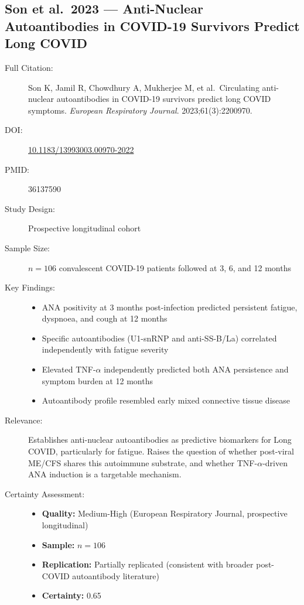 \subsection{Son et al.\ 2023 --- Anti-Nuclear Autoantibodies in COVID-19 Survivors Predict Long COVID}

\begin{description}
    \item[Full Citation:] Son K, Jamil R, Chowdhury A, Mukherjee M, et al.\ Circulating anti-nuclear autoantibodies in COVID-19 survivors predict long COVID symptoms. \textit{European Respiratory Journal}. 2023;61(3):2200970. \cite{Son2023}
    \item[DOI:] \href{https://doi.org/10.1183/13993003.00970-2022}{10.1183/13993003.00970-2022}
    \item[PMID:] 36137590
    \item[Study Design:] Prospective longitudinal cohort
    \item[Sample Size:] $n=106$ convalescent COVID-19 patients followed at 3, 6, and 12 months
    \item[Key Findings:]
    \begin{itemize}
        \item ANA positivity at 3 months post-infection predicted persistent fatigue, dyspnoea, and cough at 12 months
        \item Specific autoantibodies (U1-snRNP and anti-SS-B/La) correlated independently with fatigue severity
        \item Elevated TNF-$\alpha$ independently predicted both ANA persistence and symptom burden at 12 months
        \item Autoantibody profile resembled early mixed connective tissue disease
    \end{itemize}
    \item[Relevance:] Establishes anti-nuclear autoantibodies as predictive biomarkers for Long COVID, particularly for fatigue. Raises the question of whether post-viral ME/CFS shares this autoimmune substrate, and whether TNF-$\alpha$-driven ANA induction is a targetable mechanism.
    \item[Certainty Assessment:]
    \begin{itemize}
        \item \textbf{Quality:} Medium-High (European Respiratory Journal, prospective longitudinal)
        \item \textbf{Sample:} $n=106$
        \item \textbf{Replication:} Partially replicated (consistent with broader post-COVID autoantibody literature)
        \item \textbf{Certainty:} 0.65
    \end{itemize}
\end{description}

